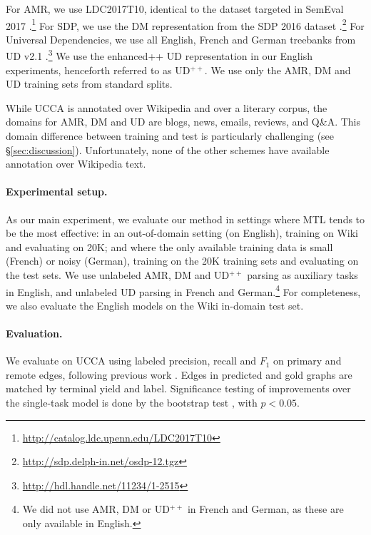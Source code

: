 \documentclass[11pt,a4paper]{article}
\begin{document}
For AMR, we use LDC2017T10, identical to the dataset targeted in SemEval 2017
\cite{may2017semeval}.\footnote{\mbox{\url{http://catalog.ldc.upenn.edu/LDC2017T10}}}
For SDP, we use the DM representation from the SDP 2016 dataset
\cite{oepen2016towards}.\footnote{\url{http://sdp.delph-in.net/osdp-12.tgz}}
For Universal Dependencies, we use all English, French and German treebanks from UD v2.1
\cite{11234/1-2515}.\footnote{\url{http://hdl.handle.net/11234/1-2515}}
We use the enhanced++ UD representation \cite{SCHUSTER16.779} in our English experiments,
henceforth referred to as UD$^{++}$.
We use only the AMR, DM and UD training sets from standard splits.

While UCCA is annotated over Wikipedia and over a literary corpus,
the domains for AMR, DM and UD are blogs, news, emails, reviews, and Q\&A.
This domain difference between training and test is particularly challenging (see \S\ref{sec:discussion}).
Unfortunately, none of the other schemes have available annotation over Wikipedia text.

\paragraph{Experimental setup.}

As our main experiment, we evaluate our method in settings where MTL tends to be the most effective:
in an out-of-domain setting (on English),
training on Wiki and evaluating on 20K;
and where the only available training data is small (French)
or noisy (German), training on the 20K training sets and evaluating on the test sets.
We use unlabeled AMR, DM and UD$^{++}$ parsing as auxiliary tasks in English,
and unlabeled UD parsing in French and German.\footnote{We did not use AMR, DM or UD$^{++}$ in French
and German, as these are only available in English.}
For completeness, we also evaluate the English models on the Wiki in-domain test set.


\paragraph{Evaluation.}

We evaluate on UCCA using labeled precision, recall and $F_1$ 
on primary and remote edges,
following previous work \cite{hershcovich2017a}.
Edges in predicted and gold graphs are matched by terminal yield and label.
Significance testing of improvements over the single-task model is done
by the bootstrap test \cite{berg2012empirical}, with $p<0.05$.
\end{document}
